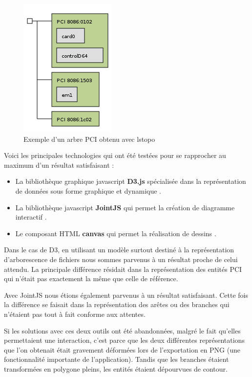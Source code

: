 \documentclass [a4paper,11pt]{article}
\begin{document}
\begin{figure}[H]
\centering
\includegraphics[scale=0.5]{img/treePCI.png}
\caption{Exemple d'un arbre PCI obtenu avec lstopo}
\end{figure}

Voici les principales technologies qui ont été testées pour se rapprocher au maximum d’un résultat satisfaisant :
\newline

\begin{itemize}
 \item La bibliothèque graphique javascript \textbf{D3.js} spécialisée dans la représentation de données sous forme graphique et dynamique \cite{d3}.
 \item La bibliothèque javascript \textbf{JointJS} qui permet la création de diagramme interactif \cite{jointjs}.
 \item Le composant HTML \textbf{canvas} qui permet la réalisation de dessins \cite{canvas}.
 \newline
\end{itemize}

Dans le cas de D3, en utilisant un modèle surtout destiné à la représentation d’arborescence de fichiers \cite{Bostock16} nous sommes parvenus à un résultat proche de celui attendu. La principale différence résidait dans la représentation des entités PCI qui n’était pas exactement la même que celle de référence.
\newline

Avec JointJS nous étions également parvenus à un résultat satisfaisant. Cette fois la différence se faisait dans la représentation des arêtes ou des branches qui n’étaient pas tout à fait conforme aux attentes.
\newline

Si les solutions avec ces deux outils ont été abandonnées, malgré le fait qu’elles permettaient une interaction, c’est parce que les deux différentes représentations que l’on obtenait était gravement déformées lors de l’exportation en PNG (une fonctionnalité importante de l’application). Tandis que les branches étaient transformées en polygone pleins, les entités étaient dépourvues de contour. 
\newline
\end{document}
